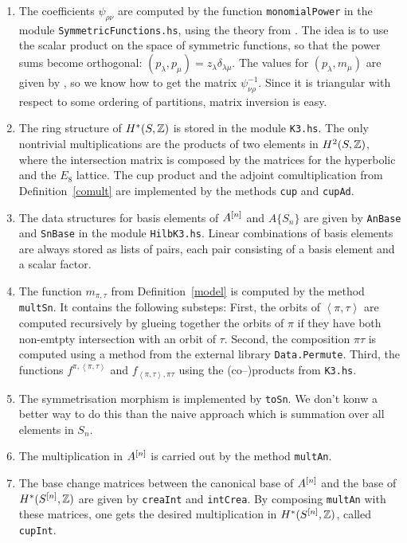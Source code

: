 \begin{enumerate}
 \item The coefficients $\psi_{\rho\nu}$ are computed by the function \verb|monomialPower| in the module \verb|SymmetricFunctions.hs|, using the theory from \cite[Sect.~3.7]{Lascoux}. The idea is to use the scalar product on the space of symmetric functions, so that the power sums become orthogonal: $(p_\lambda,p_\mu) = z_\lambda \delta_{\lambda\mu}$. The values for $(p_\lambda,m_\mu)$ are given by \cite[Lemma~3.7.1]{Lascoux}, so we know how to get the matrix $\psi_{\nu\rho}^{-1}$. Since it is triangular with respect to some ordering of partitions, matrix inversion is easy.
 \item The ring structure of $H^*(S,\mathbb{Z})$ is stored in the module \verb|K3.hs|. The only nontrivial multiplications are the products of two elements in $H^2(S,\mathbb{Z})$, where the intersection matrix is composed by the matrices for the hyperbolic and the $E_8$ lattice. The cup product and the adjoint comultiplication from Definition~\ref{comult} are implemented by the methods \verb|cup| and \verb|cupAd|.
 \item The data structures for basis elements of $A^{[n]}$ and $A\{S_n\}$ are given by \verb|AnBase| and \verb|SnBase| in the module \verb|HilbK3.hs|. Linear combinations of basis elements are always stored as lists of pairs, each pair consisting of a basis element and a scalar factor.
 \item The function $m_{\pi,\tau}$ from Definition~\ref{model} is computed by the method \verb|multSn|. It contains the following substeps: First, the orbits of $\left<\pi,\tau\right>$ are computed recursively by glueing together the orbits of $\pi$ if they have both non-emtpty intersection with an orbit of $\tau$. Second, the composition $\pi\tau$ is computed using a method from the external library \verb|Data.Permute|. Third, the functions $f^{\pi,\left<\pi,\tau\right>}$ and $f_{\left<\pi,\tau\right>,\pi\tau}$ using the (co--)products from \verb|K3.hs|.
 \item The symmetrisation morphism is implemented by \verb|toSn|. We don't konw a better way to do this than the naive approach which is summation over all elements in $S_n$.
 \item The multiplication in $A^{[n]}$ is carried out by the method \verb|multAn|.
 \item The base change matrices between the canonical base of $A^{[n]}$ and the base of $H^*(S^{[n]},\mathbb{Z})$ are given by \verb|creaInt| and \verb|intCrea|. By composing \verb|multAn| with these matrices, one gets the desired multiplication in $H^*(S^{[n]},\mathbb{Z})$, called \verb|cupInt|.
\end{enumerate}

